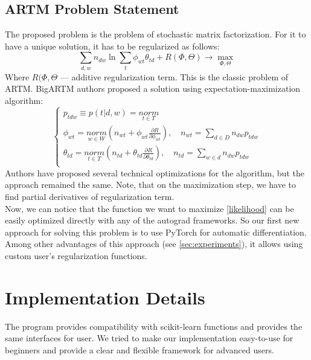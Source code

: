 \documentclass{article}
\begin{document}
\subsection{ARTM Problem Statement}
The proposed problem is the problem of stochastic matrix factorization. For it to have a unique solution, it has to be regularized as follows:
\begin{equation}
    \sum_{d, w} n_{dw} \ln \sum_{t} \phi_{wt}\theta_{td} + R(\Phi, \Theta) \rightarrow \max_{\Phi, \Theta}
    \label{likelihood}
\end{equation}
Where $R(\Phi, \Theta$ --- additive regularization term. This is the classic problem of ARTM. BigARTM authors proposed a solution using expectation-maximization algorithm:
\begin{equation}
    \begin{cases}
        p_{tdw} \equiv p(t|d, w) = \underset{t \in T}{norm} \\
        \phi_{wt} = \underset{w \in W}{norm}\left(n_{wt} + \phi_{wt}\frac{\partial R}{\partial \phi_{wt}}\right), \quad n_{wt} = \underset{d \in D}{\sum} n_{dw}p_{tdw} \\
        \theta_{td} = \underset{t \in T}{norm}\left(n_{td} + \theta_{td}\frac{\partial R}{\partial \theta_{td}}\right), \quad n_{td} = \underset{w \in d}{\sum} n_{dw}p_{tdw} \\
    \end{cases}
    \label{em}
\end{equation}
Authors have proposed several technical optimizations for the algorithm, but the approach remained the same. Note, that on the maximization step, we have to find partial derivatives of regularization term. \\

Now, we can notice that the function we want to maximize \ref{likelihood}  can be easily optimized directly with any of the autograd frameworks. So our first new approach for solving this problem is to use PyTorch for automatic differentiation. Among other advantages of this approach (see \ref{sec:experiments}), it allows using custom user's regularization functions.

\section{\centering Implementation Details}
\label{sec:implementation}
The program provides compatibility with scikit-learn functions and provides the same interfaces for user. We tried to make our implementation easy-to-use for beginners and provide a clear and flexible framework for advanced users.\\
\end{document}
